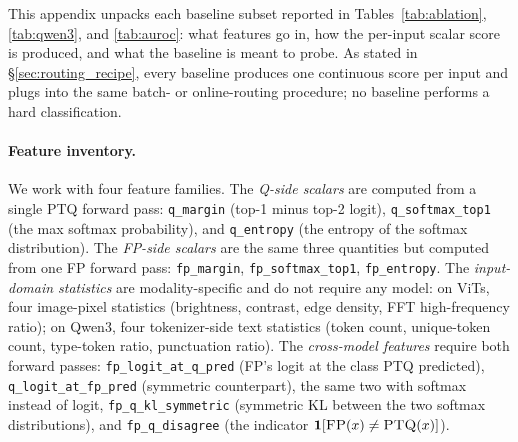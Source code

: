 \documentclass{article}
\newcommand{\fp}{\textsc{FP}\xspace}
\newcommand{\ptq}{\textsc{PTQ}\xspace}
\begin{document}
This appendix unpacks each baseline subset reported in Tables~\ref{tab:ablation}, \ref{tab:qwen3}, and \ref{tab:auroc}: what features go in, how the per-input scalar score is produced, and what the baseline is meant to probe. As stated in \S\ref{sec:routing_recipe}, every baseline produces one continuous score per input and plugs into the same batch- or online-routing procedure; no baseline performs a hard classification.

\paragraph{Feature inventory.}
We work with four feature families. The \emph{Q-side scalars} are computed from a single \ptq{} forward pass: \texttt{q\_margin} (top-1 minus top-2 logit), \texttt{q\_softmax\_top1} (the max softmax probability), and \texttt{q\_entropy} (the entropy of the softmax distribution). The \emph{FP-side scalars} are the same three quantities but computed from one \fp{} forward pass: \texttt{fp\_margin}, \texttt{fp\_softmax\_top1}, \texttt{fp\_entropy}. The \emph{input-domain statistics} are modality-specific and do not require any model: on ViTs, four image-pixel statistics (brightness, contrast, edge density, FFT high-frequency ratio); on Qwen3, four tokenizer-side text statistics (token count, unique-token count, type-token ratio, punctuation ratio). The \emph{cross-model features} require both forward passes: \texttt{fp\_logit\_at\_q\_pred} (\fp{}'s logit at the class \ptq{} predicted), \texttt{q\_logit\_at\_fp\_pred} (symmetric counterpart), the same two with softmax instead of logit, \texttt{fp\_q\_kl\_symmetric} (symmetric KL between the two softmax distributions), and \texttt{fp\_q\_disagree} (the indicator $\mathbf{1}[\fp(x) \neq \ptq(x)]$).
\end{document}
